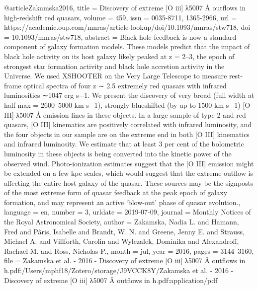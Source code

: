 {@article{Zakamska2016,
	title = {Discovery of extreme [{O} iii] λ5007 Å outflows in high-redshift red quasars},
	volume = {459},
	issn = {0035-8711, 1365-2966},
	url = {https://academic.oup.com/mnras/article-lookup/doi/10.1093/mnras/stw718},
	doi = {10.1093/mnras/stw718},
	abstract = {Black hole feedback is now a standard component of galaxy formation models. These models predict that the impact of black hole activity on its host galaxy likely peaked at z = 2–3, the epoch of strongest star formation activity and black hole accretion activity in the Universe. We used XSHOOTER on the Very Large Telescope to measure rest-frame optical spectra of four z ∼ 2.5 extremely red quasars with infrared luminosities ∼1047 erg s−1. We present the discovery of very broad (full width at half max = 2600–5000 km s−1), strongly blueshifted (by up to 1500 km s−1) [O III] λ5007 Å emission lines in these objects. In a large sample of type 2 and red quasars, [O III] kinematics are positively correlated with infrared luminosity, and the four objects in our sample are on the extreme end in both [O III] kinematics and infrared luminosity. We estimate that at least 3 per cent of the bolometric luminosity in these objects is being converted into the kinetic power of the observed wind. Photo-ionization estimates suggest that the [O III] emission might be extended on a few kpc scales, which would suggest that the extreme outﬂow is affecting the entire host galaxy of the quasar. These sources may be the signposts of the most extreme form of quasar feedback at the peak epoch of galaxy formation, and may represent an active ‘blow-out’ phase of quasar evolution.},
	language = {en},
	number = {3},
	urldate = {2019-07-09},
	journal = {Monthly Notices of the Royal Astronomical Society},
	author = {Zakamska, Nadia L. and Hamann, Fred and Pâris, Isabelle and Brandt, W. N. and Greene, Jenny E. and Strauss, Michael A. and Villforth, Carolin and Wylezalek, Dominika and Alexandroff, Rachael M. and Ross, Nicholas P.},
	month = jul,
	year = {2016},
	pages = {3144--3160},
	file = {Zakamska et al. - 2016 - Discovery of extreme [O iii] λ5007 Å outflows in h.pdf:/Users/mphf18/Zotero/storage/J9VCCK8Y/Zakamska et al. - 2016 - Discovery of extreme [O iii] λ5007 Å outflows in h.pdf:application/pdf}
}


}
